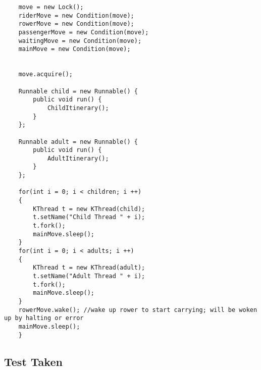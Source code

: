\documentclass{article}
\begin{document}
\begin{spacing}{1.1}
\begin{lstlisting}
	move = new Lock();
	riderMove = new Condition(move);
	rowerMove = new Condition(move);
	passengerMove = new Condition(move);
	waitingMove = new Condition(move);
	mainMove = new Condition(move);
	

	move.acquire();
	
	Runnable child = new Runnable() {
	    public void run() {
            ChildItinerary();
        }
    };
    
	Runnable adult = new Runnable() {
	    public void run() {
            AdultItinerary();
        }
    };
    
    for(int i = 0; i < children; i ++)
    {
    	KThread t = new KThread(child);
    	t.setName("Child Thread " + i);
    	t.fork();
    	mainMove.sleep();
    }
	for(int i = 0; i < adults; i ++)
	{
    	KThread t = new KThread(adult);
    	t.setName("Adult Thread " + i);
    	t.fork();
    	mainMove.sleep();
	}
	rowerMove.wake(); //wake up rower to start carrying; will be woken up by halting or error
	mainMove.sleep();
    } 
\end{lstlisting}

\subsection{Test Taken}

\end{spacing}
\end{document}
